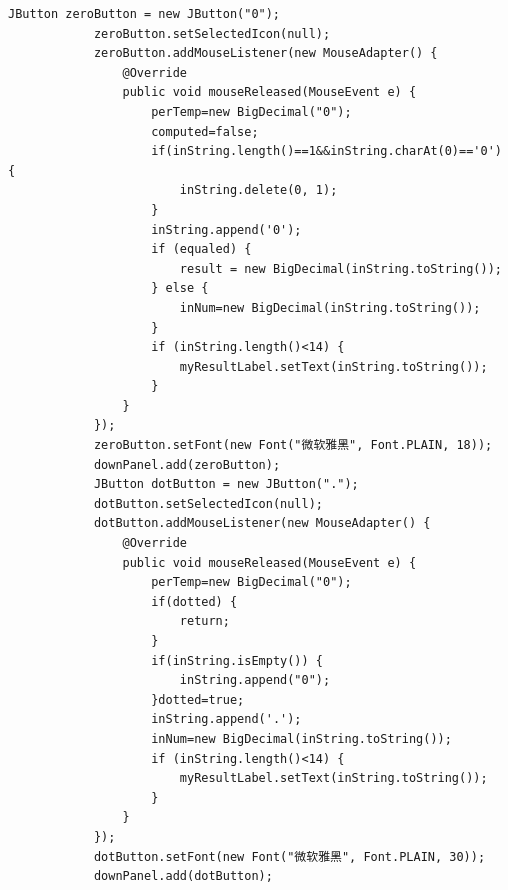 \documentclass{ctexart}
\begin{document}
\begin{lstlisting}[caption=冗杂的代码]
            JButton zeroButton = new JButton("0");
            zeroButton.setSelectedIcon(null);
            zeroButton.addMouseListener(new MouseAdapter() {
                @Override
                public void mouseReleased(MouseEvent e) {
                    perTemp=new BigDecimal("0");
                    computed=false;
                    if(inString.length()==1&&inString.charAt(0)=='0') {
                        inString.delete(0, 1);
                    }
                    inString.append('0');
                    if (equaled) {
                        result = new BigDecimal(inString.toString());		
                    } else {
                        inNum=new BigDecimal(inString.toString());
                    }
                    if (inString.length()<14) {
                        myResultLabel.setText(inString.toString());
                    }
                }
            });
            zeroButton.setFont(new Font("微软雅黑", Font.PLAIN, 18));
            downPanel.add(zeroButton);
            JButton dotButton = new JButton(".");
            dotButton.setSelectedIcon(null);
            dotButton.addMouseListener(new MouseAdapter() {
                @Override
                public void mouseReleased(MouseEvent e) {
                    perTemp=new BigDecimal("0");
                    if(dotted) {
                        return;
                    }
                    if(inString.isEmpty()) {
                        inString.append("0");
                    }dotted=true;
                    inString.append('.');
                    inNum=new BigDecimal(inString.toString());
                    if (inString.length()<14) {
                        myResultLabel.setText(inString.toString());
                    }
                }
            });
            dotButton.setFont(new Font("微软雅黑", Font.PLAIN, 30));
            downPanel.add(dotButton);
            

\end{lstlisting}
\end{document}
